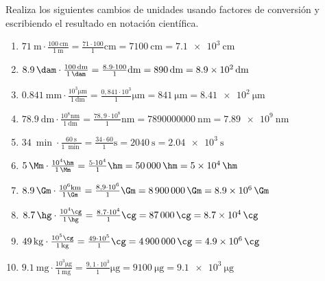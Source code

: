 \documentclass[
  spanish,
]{article}
\begin{document}
\begin{exercise}Realiza los siguientes cambios de unidades usando
factores de conversión y escribiendo el resultado en notación
científica.

\begin{enumerate}
\def\labelenumi{\alph{enumi})}
\item
  \(\qty{71}{\m} \cdot \frac{\qty{100}{\cm}}{\qty{1}{\m}} = \frac{71 \cdot 100}{1} \unit{\cm} = \qty{7100}{\cm} = \qty{7.1e3}{\cm}\)
\item
  \(\qty{8,9}{\dam} \cdot \frac{\qty{100}{\dm}}{\qty{1}{\dam}} = \frac{8.9 \cdot 100}{1} \unit{\dm} = \qty{890}{\dm} = \qty{8.9e2}{\dm}\)
\item
  \(\qty{0,841}{\mm} \cdot \frac{10^3 \unit{\um}}{\qty{1}{\dm}} = \frac{0,841 \cdot 10^3}{1} \unit{\um} = \qty{841}{\um} = \qty{8.41e2}{\um}\)
\item
  \(\qty{78,9}{\dm} \cdot \frac{10^8 \unit{\nm}}{\qty{1}{\dm}} = \frac{78,9 \cdot 10^8}{1} \unit{\nm} = \qty{7890000000}{\nm} = \qty{7.89e9}{\nm}\)
\item
  \(\qty{34}{\min} \cdot \frac{\qty{60}{\s}}{\qty{1}{\min}} = \frac{34 \cdot 60}{1} \unit{\s} = \qty{2040}{\s} = \qty{2.04e3}{\s}\)
\item
  \(\qty{5}{\Mm} \cdot \frac{10^4 \unit{\hm}}{\qty{1}{\Mm}} = \frac{5 \cdot 10^4}{1} \unit{\hm} = \qty{50000}{\hm} = \qty{5e4}{\hm}\)
\item
  \(\qty{8,9}{\Gm} \cdot \frac{10^6 \unit{\km}}{\qty{1}{\Gm}} = \frac{8,9 \cdot 10^6}{1} \unit{\Gm} = \qty{8900000}{\Gm} = \qty{8.9e6}{\Gm}\)
\item
  \(\qty{8,7}{\hg} \cdot \frac{10^4 \unit{\cg}}{\qty{1}{\hg}} = \frac{8.7 \cdot 10^4}{1} \unit{\cg} = \qty{87000}{\cg} = \qty{8.7e4}{\cg}\)
\item
  \(\qty{49}{\kg} \cdot \frac{10^5 \unit{\cg}}{\qty{1}{\kg}} = \frac{49 \cdot 10^5}{1} \unit{\cg} = \qty{4900000}{\cg} = \qty{4.9e6}{\cg}\)
\item
  \(\qty{9,1}{\mg} \cdot \frac{10^3 \unit{\ug}}{\qty{1}{\mg}} = \frac{9,1 \cdot 10^3}{1} \unit{\ug} = \qty{9100}{\ug} = \qty{9.1e3}{\ug}\)
\end{enumerate}

\end{exercise}
\end{document}

